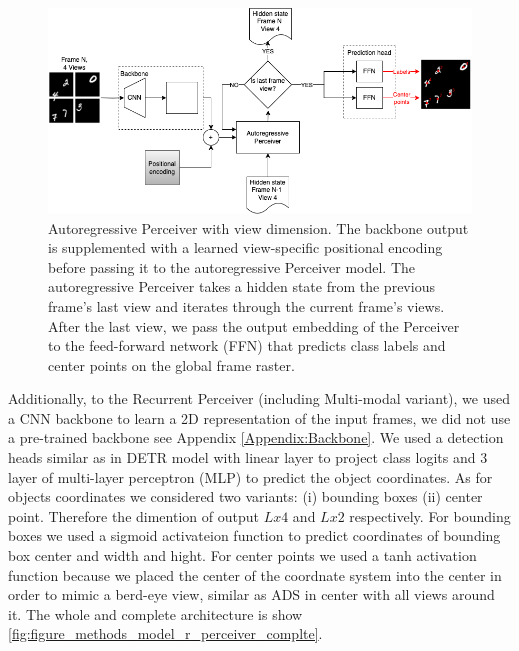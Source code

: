 \begin{figure}
    \centering
    \includegraphics[width=\textwidth]{figures/figure_methods_model_ar_perceiver_views.png}
    \caption{Autoregressive Perceiver with view dimension. The backbone output is supplemented with a learned view-specific positional encoding before passing it to the autoregressive Perceiver model. The autoregressive Perceiver takes a hidden state from the previous frame's last view and iterates through the current frame's views. After the last view, we pass the output embedding of the Perceiver to the feed-forward network (FFN) that predicts class labels and center points on the global frame raster.}
    \label{fig:figure_methods_model_ar_perceiver_views}
\end{figure}

Additionally, to the Recurrent Perceiver (including Multi-modal variant), we used a CNN backbone to learn a 2D representation of the input frames, we did not use a pre-trained backbone see Appendix \ref{Appendix:Backbone}. We used a detection heads similar as in DETR model \cite{} with linear layer to project class logits and 3 layer of multi-layer perceptron (MLP) to predict the object coordinates. As for objects coordinates we considered two variants: (i) bounding boxes (ii) center point. Therefore the dimention of output $Lx4$ and $Lx2$ respectively. For bounding boxes we used a sigmoid activateion function to predict coordinates of bounding box center and width and hight. For center points we used a tanh activation function because we placed the center of the coordnate system into the center in order to mimic a berd-eye view, similar as ADS in center with all views around it. The whole and complete architecture is show \ref{fig:figure_methods_model_r_perceiver_complte}.

